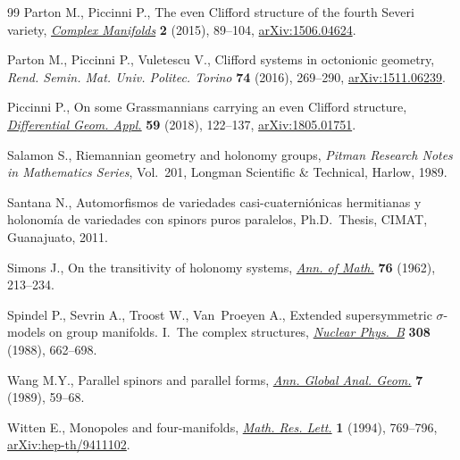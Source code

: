 \documentclass[10pt,a4paper]{amsart}
\providecommand{\LastPageEnding}{}
\numberwithin{equation}{section}
\begin{document}
\begin{thebibliography}{99}
Parton M., Piccinni P., The even {C}lifford structure of the fourth {S}everi
 variety, \href{https://doi.org/10.1515/coma-2015-0008}{\textit{Complex Manifolds}} \textbf{2} (2015), 89--104,
 \href{https://arxiv.org/abs/1506.04624}{arXiv:1506.04624}.

Parton M., Piccinni P., Vuletescu V., Clifford systems in octonionic geometry,
 \textit{Rend. Semin. Mat. Univ. Politec. Torino} \textbf{74} (2016),
 269--290, \href{https://arxiv.org/abs/1511.06239}{arXiv:1511.06239}.

Piccinni P., On some {G}rassmannians carrying an even {C}lifford structure,
 \href{https://doi.org/10.1016/j.difgeo.2018.04.007}{\textit{Differential Geom. Appl.}} \textbf{59} (2018), 122--137,
 \href{https://arxiv.org/abs/1805.01751}{arXiv:1805.01751}.

Salamon S., Riemannian geometry and holonomy groups, \textit{Pitman Research
 Notes in Mathematics Series}, Vol.~201, Longman Scientific \& Technical,
 Harlow, 1989.

Santana N., Automorfismos de variedades casi-cuaterni\'onicas hermitianas y holonom\'ia de variedades con spinors puros paralelos, Ph.D.~Thesis, CIMAT, Guanajuato, 2011.

Simons J., On the transitivity of holonomy systems, \href{https://doi.org/10.2307/1970273}{\textit{Ann. of Math.}}
 \textbf{76} (1962), 213--234.

Spindel P., Sevrin A., Troost W., Van~Proeyen A., Extended supersymmetric
 {$\sigma$}-models on group manifolds. {I}.~{T}he complex structures,
 \href{https://doi.org/10.1016/0550-3213(88)90582-2}{\textit{Nuclear Phys.~B}} \textbf{308} (1988), 662--698.

Wang M.Y., Parallel spinors and parallel forms, \href{https://doi.org/10.1007/BF00137402}{\textit{Ann. Global Anal.
 Geom.}} \textbf{7} (1989), 59--68.

Witten E., Monopoles and four-manifolds, \href{https://doi.org/10.4310/MRL.1994.v1.n6.a13}{\textit{Math. Res. Lett.}} \textbf{1}
 (1994), 769--796, \href{https://arxiv.org/abs/hep-th/9411102}{arXiv:hep-th/9411102}.

\end{thebibliography}\LastPageEnding
\end{document}
